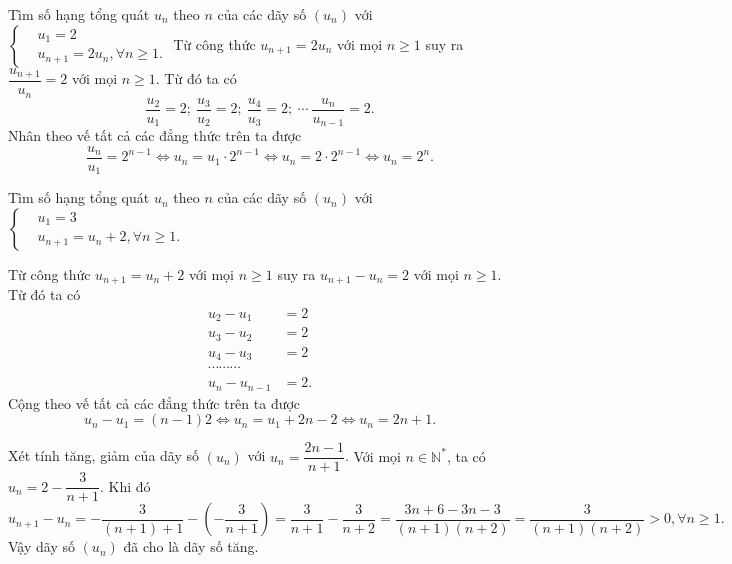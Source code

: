 \begin{bt}%
	Tìm số hạng tổng quát $u_n$ theo $n$ của các dãy số $(u_n)$ với $\left\{\begin{aligned}&u_1=2 \\&u_{n+1}=2u_n, \forall n\geq 1.\end{aligned}\right.$
	\loigiai
	{
		Từ công thức $u_{n+1}=2u_n$ với mọi $n\geq 1$ suy ra $\dfrac{u_{n+1}}{u_n}=2$ với mọi $n\geq 1$. Từ đó ta có
			$$\dfrac{u_2}{u_1} =2;\ \dfrac{u_3}{u_2} =2;\ \dfrac{u_4}{u_3} =2;\ 			\cdots\ \dfrac{u_n}{u_{n-1}} =2.$$
		Nhân theo vế tất cả các đẳng thức trên ta được
		\[\dfrac{u_n}{u_1} = 2^{n-1} \Leftrightarrow u_n=u_1\cdot 2^{n-1} \Leftrightarrow u_n = 2\cdot 2^{n-1} \Leftrightarrow u_n=2^n.\]
	}
\end{bt}

\begin{bt}%
	Tìm số hạng tổng quát $u_n$ theo $n$ của các dãy số $(u_n)$ với $\left\{\begin{aligned}&u_1=3 \\&u_{n+1}=u_n+2, \forall n\geq 1.\end{aligned}\right.$
	
	\loigiai
	{Từ công thức $u_{n+1}=u_n+2$ với mọi $n\geq 1$ suy ra $u_{n+1}-u_n=2$ với mọi $n\geq 1$. Từ đó ta có
		\allowdisplaybreaks
		\begin{align*}
			u_2-u_1 &= 2\\
			u_3-u_2 &= 2\\
			u_4-u_3 &= 2\\
			\cdots\cdots\cdots\\
			u_{n}-u_{n-1} & =2.
		\end{align*}
		Cộng theo vế tất cả các đẳng thức trên ta được
		\[u_n-u_1 = (n-1)2 \Leftrightarrow u_n = u_1+2n-2 \Leftrightarrow u_n=2n+1.\]
		
	}
\end{bt}

\begin{bt}%
	Xét tính tăng, giảm của dãy số $(u_n)$ với $u_n=\dfrac{2n-1}{n+1}$.
	\loigiai
	{Với mọi $n\in \mathbb{N}^*$, ta có $u_n=2-\dfrac{3}{n+1}$. Khi đó
		\[u_{n+1}-u_n= -\dfrac{3}{(n+1)+1}-\left(-\dfrac{3}{n+1}\right) = \dfrac{3}{n+1}-\dfrac{3}{n+2} = \dfrac{3n+6-3n-3}{(n+1)(n+2)} = \dfrac{3}{(n+1)(n+2)}>0, \forall n\geq 1.\]
		Vậy dãy số $(u_n)$ đã cho là dãy số tăng.
	}
\end{bt}

